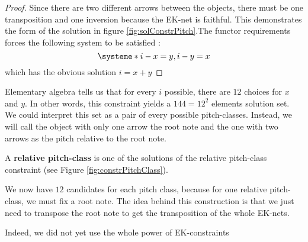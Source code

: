 \begin{proof}
    Since there are two different arrows between the objects, there must be one transposition and one inversion because the EK-net is faithful. This demonstrates the form of the solution in figure \ref{fig:solConstrPitch}.The functor requirements forces the following system to be satisfied : 
    $$\systeme*{i-x = y,i-y = x }$$
    which has the obvious solution $i = x + y$

\end{proof}

Elementary algebra tells us that for every $i$ possible, there are $12$ choices for $x$ and $y$. In other words, this constraint yields a $144 = 12^2$ elements solution set. We could interpret this set as a pair of every possible pitch-classes. Instead, we will call the object with only one arrow the root note and the one with two arrows as the pitch relative to the root note.

\begin{defn}
    A \textbf{relative pitch-class} is one of the solutions of the relative pitch-class constraint (see Figure \ref{fig:constrPitchClass}).
\end{defn}

We now have $12$ candidates for each pitch class, because for one relative pitch-class, we must fix a root note. The idea behind this construction is that we just need to transpose the root note to get the transposition of the whole EK-nets.

Indeed, we did not yet use the whole power of EK-constraints



